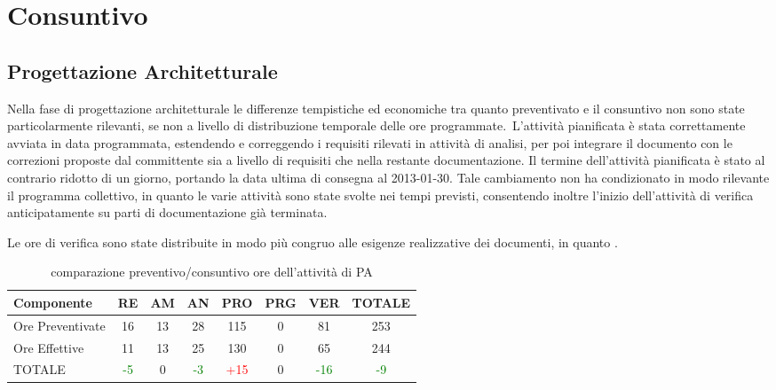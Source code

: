 \section{Consuntivo}
\subsection{Progettazione Architetturale}
Nella fase di progettazione architetturale le differenze tempistiche ed economiche tra quanto preventivato e il consuntivo non sono state particolarmente rilevanti, se non a livello di distribuzione temporale delle ore programmate.\
L'attività pianificata è stata correttamente avviata in data programmata, estendendo e correggendo i requisiti rilevati in attività di analisi, per poi integrare il documento con le correzioni proposte dal committente sia a livello di requisiti che nella restante documentazione. Il termine dell'attività pianificata è stato al contrario ridotto di un giorno, portando la data ultima di consegna al 2013-01-30. Tale cambiamento non ha condizionato in modo rilevante il programma collettivo, in quanto le varie attività sono state svolte nei tempi previsti, consentendo inoltre l'inizio dell'attività di verifica anticipatamente su parti di documentazione già terminata.

Le ore di verifica sono state distribuite in modo più congruo alle esigenze realizzative dei documenti, in quanto . 

\begin{table}[h]
\centering
\begin{tabular}{|l|c c c c c c|c|}
\hline
Componente		& RE&   AM&   AN&  PRO& PRG& VER & TOTALE\\
\hline
Ore Preventivate	& 16&    13&   28&  115& 0&     81  & 253\\
Ore Effettive       	& 11 &   13&   25&  130& 0&     65 & 244\\
\hline
TOTALE			& \textcolor{green}{-5} &    0&    \textcolor{green}{-3}&    \textcolor{red}{+15}&0&    \textcolor{green}{-16} & \textcolor{green}{-9}\\
\hline
\end{tabular}
\caption{comparazione preventivo/consuntivo ore dell'attività di PA}\label{tab:consoreprog}
\end{table}


